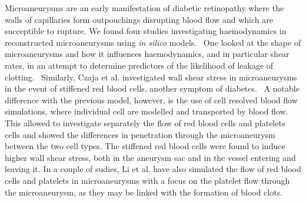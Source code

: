 \documentclass[12pt,a4paper]{journal}
\begin{document}
Microaneurysms are an early manifestation of diabetic retinopathy where the walls of capillaries form outpouchings disrupting blood flow and which are succeptible to rupture.
We found four studies investigating haemodynamics in reconstructed microaneurysms using \textit{in silico} models.~\cite{Bernabeu_2018,Czaja_2022,Li_2020,Li_2022}
One looked at the shape of microaneurysms and how it influences haemodynamics, and in particular shear rates, in an attempt to determine predictors of the likelihood of leakage of clotting.~\cite{Bernabeu_2018}
Similarly, Czaja et al. investigated wall shear stress in microaneurysms in the event of stiffened red blood cells, another symptom of diabetes.~\cite{Czaja_2022}
A notable difference with the previous model, however, is the use of cell resolved blood flow simulations, where individual cell are modelled and transported by blood flow.
This allowed to investigate separately the flow of red blood cells and platelets cells and showed the differences in penetration through the microaneurysm between the two cell types.
The stiffened red blood cells were found to induce higher wall shear stress, both in the aneurysm sac and in the vessel entering and leaving it.
In a couple of sudies, Li et al. have also simulated the flow of red blood cells and platelets in microaneurysms with a focus on the platelet flow through the microaneurysm, as they may be linked with the formation of blood clots.~\cite{Li_2020,Li_2022}
\end{document}
